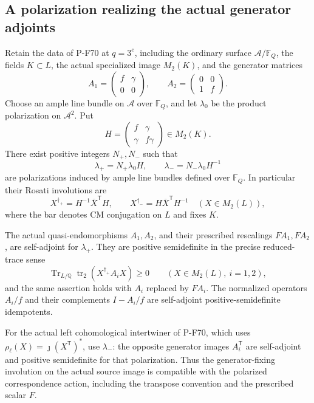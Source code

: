 \subsection{A polarization realizing the actual generator adjoints}

\begin{proposition}
\label{prop:nonstandardpolarization}
Retain the data of P-F70 at $q=3^e$, including the ordinary surface
$\mathcal A/\mathbb F_Q$, the fields $K\subset L$, the actual
specialized image $M_2(K)$, and the generator matrices
\[
 A_1=\begin{pmatrix}f&\gamma\\0&0\end{pmatrix},\qquad
 A_2=\begin{pmatrix}0&0\\1&f\end{pmatrix}.
                                                               \tag{P-F74a}
\]
Choose an ample line bundle on $\mathcal A$ over $\mathbb F_Q$,
and let $\lambda_0$ be the product polarization on $\mathcal A^2$.
Put
\[
 H=\begin{pmatrix}f&\gamma\\\gamma&f\gamma\end{pmatrix}
          \in M_2(K).
                                                               \tag{P-F74b}
\]
There exist positive integers $N_+,N_-$ such that
\[
 \lambda_+=N_+\lambda_0H,\qquad
 \lambda_-=N_-\lambda_0H^{-1}
                                                               \tag{P-F74c}
\]
are polarizations induced by ample line bundles defined over
$\mathbb F_Q$.  In particular their Rosati involutions are
\[
 X^{\dagger_+}=H^{-1}\overline X^{\mathsf T}H,
 \qquad
 X^{\dagger_-}=H\overline X^{\mathsf T}H^{-1}
                    \quad (X\in M_2(L)),
                                                               \tag{P-F74d}
\]
where the bar denotes CM conjugation on $L$ and fixes $K$.

The actual quasi-endomorphisms $A_1,A_2$, and their prescribed
rescalings $FA_1,FA_2$, are self-adjoint for $\lambda_+$.
They are positive semidefinite in the precise reduced-trace sense
\[
 \operatorname{Tr}_{L/\mathbb Q}\operatorname{tr}_2
               (X^{\dagger_+}A_iX)\ge0
                       \qquad (X\in M_2(L),\ i=1,2),
                                                               \tag{P-F74e}
\]
and the same assertion holds with $A_i$ replaced by $FA_i$.
The normalized operators $A_i/f$ and their complements
$I-A_i/f$ are self-adjoint positive-semidefinite idempotents.

For the actual left cohomological intertwiner of P-F70, which
uses $\rho_\ell(X)=\jmath(X^{\mathsf T})^*$, use $\lambda_-$:
the opposite generator images $A_i^{\mathsf T}$ are self-adjoint
and positive semidefinite for that polarization.  Thus the
generator-fixing involution on the actual source image is
compatible with the polarized correspondence action, including
the transpose convention and the prescribed scalar $F$.
\end{proposition}

